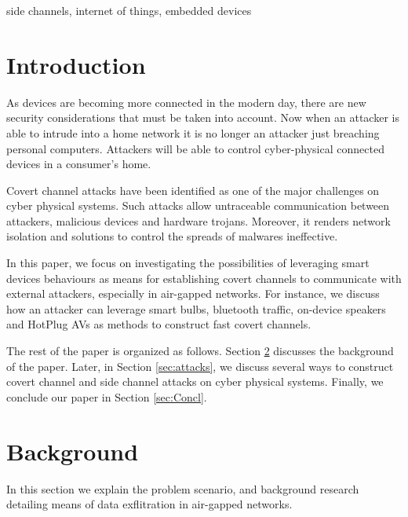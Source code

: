 \documentclass[conference]{IEEEtran}
\begin{document}
\begin{IEEEkeywords}
side channels, internet of things, embedded devices
\end{IEEEkeywords}

\section{Introduction}
As devices are becoming more connected in the modern day, there are new security considerations that must be taken into account. Now when an attacker is able to intrude into a home network it is no longer an attacker just breaching personal computers. Attackers will be able to control cyber-physical connected devices in a consumer's home. 

Covert channel attacks have been identified as one of the major challenges on cyber physical systems. Such attacks allow untraceable communication between attackers, malicious devices and hardware trojans. Moreover, it renders network isolation and solutions to control the spreads of malwares ineffective.


In this paper, we focus on investigating the possibilities of leveraging smart devices behaviours as means for establishing covert channels to communicate with external attackers, especially in air-gapped networks. For instance, we discuss how an attacker can leverage smart bulbs, bluetooth traffic, on-device speakers and HotPlug AVs as methods to construct fast covert channels. 


The rest of the paper is organized as follows. Section \ref{sec:back} discusses the background of the paper. Later, in Section \ref{sec:attacks}, we discuss several ways to construct covert channel and side channel attacks on cyber physical systems. Finally, we conclude our paper in Section \ref{sec:Concl}.

\section{Background}
\label{sec:back}
In this section we explain the problem scenario, and background research detailing means of data exflitration in air-gapped networks. 

\end{document}
